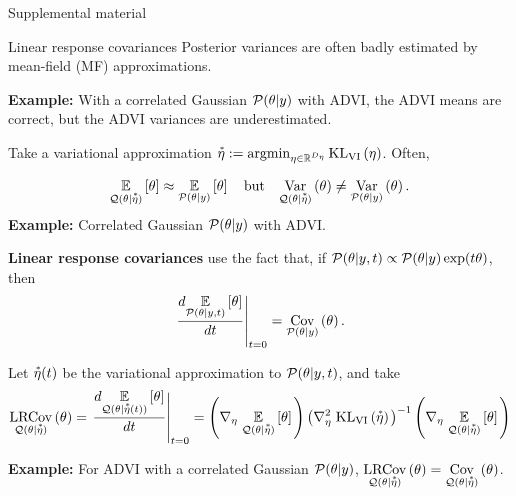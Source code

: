 \documentclass[8pt]{beamer}\usepackage[]{graphicx}\usepackage[]{color}
\begin{document}

\begin{frame}
    \huge{Supplemental material}
\end{frame}




\begin{frame}{Linear response covariances}
%
Posterior variances are often badly estimated by mean-field (MF) approximations.

\textbf{Example: } With a correlated Gaussian $\mathcal{P}(\theta \vert y)$ with ADVI,
the ADVI means are correct, but the ADVI variances are underestimated.

Take a variational approximation 
$\accentset{*}{\eta} := \operatorname*{\mathrm{argmin}}_{\eta \in \mathbb{R}^{D_{\eta}}} \mathrm{KL}_{\mathrm{VI}}\left(\eta\right)$.  Often,

\begin{align}\label{eq:mfvb_conceit}
    \underset{\mathcal{Q}(\theta \vert \accentset{*}{\eta})}{\mathbb{E}}\left[\theta\right] \approx
    \underset{\mathcal{P}(\theta \vert y)}{\mathbb{E}}\left[\theta\right] \quad\textrm{but}\quad
    \underset{\mathcal{Q}(\theta \vert \accentset{*}{\eta})}{\mathrm{Var}}\left(\theta\right) \ne
    \underset{\mathcal{P}(\theta \vert y)}{\mathrm{Var}}\left(\theta\right).
\end{align}    
%
\textbf{Example: }Correlated Gaussian $\mathcal{P}(\theta \vert y)$ with ADVI.

\textbf{Linear response covariances} use the fact that, if
$\mathcal{P}(\theta \vert y, t) \propto \mathcal{P}(\theta \vert y) \exp(t \theta)$, then
%
\begin{align}\label{eq:deriv_is_cov}
    \left. \frac{d \underset{\mathcal{P}(\theta \vert y, t)}{\mathbb{E}}\left[\theta\right]}{dt} \right|_{t=0} = \underset{\mathcal{P}(\theta \vert y)}{\mathrm{Cov}}\left(\theta\right).
\end{align}

Let $\accentset{*}{\eta}(t)$ be the variational approximation to $\mathcal{P}(\theta \vert y, t)$, and
take
%
\begin{align*}
    \underset{\mathcal{Q}(\theta \vert \accentset{*}{\eta})}{\mathrm{LRCov}}\left(\theta\right)
    =
    \left. \frac{d \underset{\mathcal{Q}(\theta \vert \accentset{*}{\eta}(t))}{\mathbb{E}}\left[\theta\right]}{dt} \right|_{t=0}
    =
    \left( \nabla_{\eta} \left. \underset{\mathcal{Q}(\theta \vert \accentset{*}{\eta})}{\mathbb{E}}\left[\theta\right] \right.\right)
    \left(\nabla^2_{\eta} \left. \mathrm{KL}_{\mathrm{VI}}\left(\accentset{*}{\eta}\right) \right. \right)^{-1}
    \left( \nabla_{\eta} \left. \underset{\mathcal{Q}(\theta \vert \accentset{*}{\eta})}{\mathbb{E}}\left[\theta\right] \right.\right)
\end{align*}
%

\textbf{Example: } For ADVI with a correlated Gaussian $\mathcal{P}(\theta \vert y)$,
$\underset{\mathcal{Q}(\theta \vert \accentset{*}{\eta})}{\mathrm{LRCov}}\left(\theta\right)  = \underset{\mathcal{Q}(\theta \vert \accentset{*}{\eta})}{\mathrm{Cov}}\left(\theta\right)$.


\end{frame}
\end{document}

